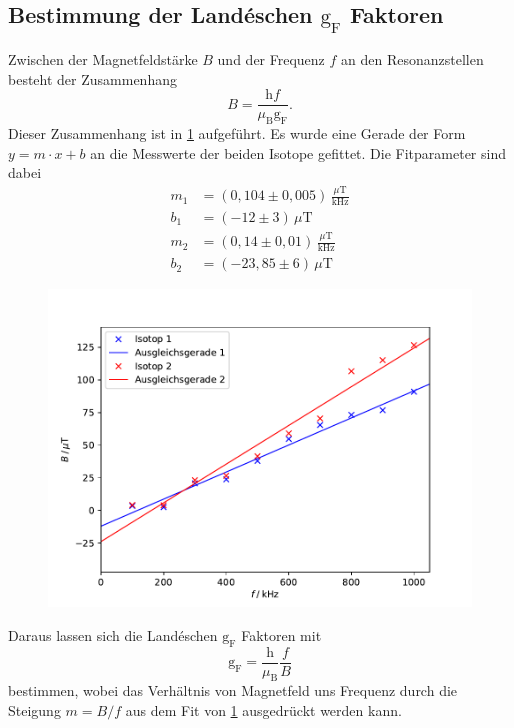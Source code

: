 \subsection{Bestimmung der Landéschen $\text{g}_{\text{F}}$ Faktoren}
Zwischen der Magnetfeldstärke $B$ und der Frequenz $f$ an den Resonanzstellen besteht der Zusammenhang
\begin{equation}
  B=\frac{\text{h}f}{\mu_{\text{B}} \text{g}_{\text{F}}} .
\end{equation}
Dieser Zusammenhang ist in \ref{fig:BFelder} aufgeführt. Es wurde eine Gerade der
Form $y=m\cdot x+b$ an die Messwerte der beiden Isotope gefittet. Die Fitparameter sind dabei
\begin{align*}
  m_1&=(0,104 \pm 0,005)\,\frac{\mu\text{T}}{\text{kHz}} \\
  b_1&=(-12 \pm 3)\,\mu\text{T}\\
  m_2&=(0,14 \pm 0,01)\,\frac{\mu\text{T}}{\text{kHz}} \\
  b_2&=(-23,85 \pm 6)\,\mu\text{T}
\end{align*}
\begin{figure}
  \centering
  \includegraphics{plots/BFelder.pdf}
  \caption{}
  \label{fig:BFelder}
\end{figure}
Daraus lassen sich die Landéschen $\text{g}_{\text{F}}$ Faktoren mit
\begin{equation}
  \text{g}_{\text{F}}=\frac{\text{h}}{\mu_{\text{B}}} \frac{f}{B}
\end{equation}
bestimmen, wobei das Verhältnis von Magnetfeld uns Frequenz durch die
Steigung $m=B/f$ aus dem Fit von \ref{fig:BFelder} ausgedrückt werden kann.\\
